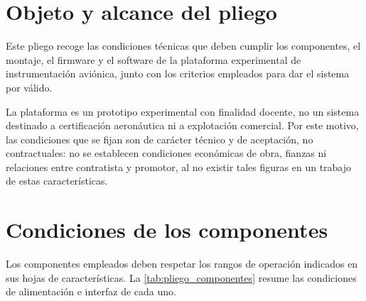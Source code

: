 
\chapter{Objeto y alcance del pliego}
\label{ch:pliego_objeto}

Este pliego recoge las condiciones técnicas que deben cumplir los componentes, el montaje, el firmware y el software de la plataforma experimental de instrumentación aviónica, junto con los criterios empleados para dar el sistema por válido.

La plataforma es un prototipo experimental con finalidad docente, no un sistema destinado a certificación aeronáutica ni a explotación comercial. Por este motivo, las condiciones que se fijan son de carácter técnico y de aceptación, no contractuales: no se establecen condiciones económicas de obra, fianzas ni relaciones entre contratista y promotor, al no existir tales figuras en un trabajo de estas características.


\chapter{Condiciones de los componentes}
\label{ch:pliego_componentes}

Los componentes empleados deben respetar los rangos de operación indicados en sus hojas de características. La \cref{tab:pliego_componentes} resume las condiciones de alimentación e interfaz de cada uno.

